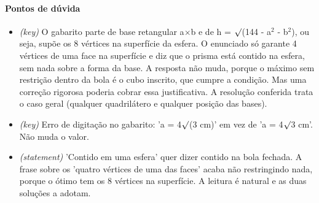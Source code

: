 \documentclass{article}%
\begin{document}
\paragraph{Pontos de dúvida}%
\begin{itemize}%
\item%
\textit{(key)} O gabarito parte de base retangular a$\times$b e de h = $\surd$(144 - a$^2$ - b$^2$), ou seja, supõe os 8 vértices na superfície da esfera. O enunciado só garante 4 vértices de uma face na superfície e diz que o prisma está contido na esfera, sem nada sobre a forma da base. A resposta não muda, porque o máximo sem restrição dentro da bola é o cubo inscrito, que cumpre a condição. Mas uma correção rigorosa poderia cobrar essa justificativa. A resolução conferida trata o caso geral (qualquer quadrilátero e qualquer posição das bases).%
\item%
\textit{(key)} Erro de digitação no gabarito: 'a = 4$\surd$(3 cm)' em vez de 'a = 4$\surd$3 cm'. Não muda o valor.%
\item%
\textit{(statement)} 'Contido em uma esfera' quer dizer contido na bola fechada. A frase sobre os 'quatro vértices de uma das faces' acaba não restringindo nada, porque o ótimo tem os 8 vértices na superfície. A leitura é natural e as duas soluções a adotam.%
\end{itemize}%
\end{document}
